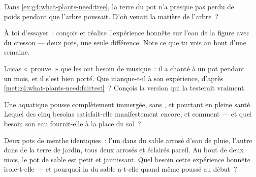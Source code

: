 \begin{exercise}[$\star$]\label{exo:g4:what-plants-need:7}
Dans \cref{ex:g4:what-plants-need:tree}, la terre du pot n'a presque
pas perdu de poids pendant que l'arbre poussait. D'où venait la
matière de l'arbre~?
\end{exercise}

\begin{exercise}[$\star$]\label{exo:g4:what-plants-need:8}
À toi d'essayer~: conçois et réalise l'expérience honnête sur l'eau
de la figure avec du cresson --- deux pots, une seule différence.
Note ce que tu vois au bout d'une semaine.
\end{exercise}

\begin{exercise}[$\star\star$]\label{exo:g4:what-plants-need:9}
Lucas «~prouve~» que les  ont besoin de musique~: il a chanté
à un pot pendant un mois, et il s'est bien porté. Que manque-t-il à
son expérience, d'après \cref{met:g4:what-plants-need:fairtest}~?
Conçois la version qui la testerait vraiment.
\end{exercise}

\begin{exercise}[$\star\star$]\label{exo:g4:what-plants-need:10}
Une  aquatique pousse complètement immergée, sans , et
pourtant en pleine santé. Lequel des cinq besoins satisfait-elle
manifestement encore, et comment --- et quel besoin son eau
fournit-elle à la place du sol~?
\end{exercise}

\begin{exercise}[$\star\star\star$]\label{exo:g4:what-plants-need:11}
Deux pots de menthe identiques~: l'un dans du sable arrosé d'eau de
pluie, l'autre dans de la terre de jardin, tous deux arrosés et
éclairés pareil. Au bout de deux mois, le pot de sable est petit et
jaunissant. Quel besoin cette expérience honnête isole-t-elle --- et
pourquoi la  du sable a-t-elle quand même poussé au début~?
\end{exercise}
